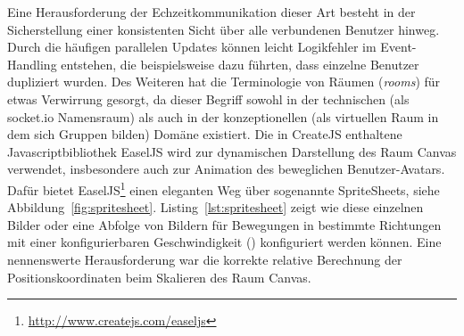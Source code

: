 Eine Herausforderung der Echzeitkommunikation dieser Art besteht in der Sicherstellung einer konsistenten Sicht über alle verbundenen Benutzer hinweg. Durch die häufigen parallelen Updates können leicht Logikfehler im Event-Handling entstehen, die beispielsweise dazu führten, dass einzelne Benutzer dupliziert wurden. Des Weiteren hat die Terminologie von Räumen (\emph{rooms}) für etwas Verwirrung gesorgt, da dieser Begriff sowohl in der technischen (als socket.io Namensraum) als auch in der konzeptionellen (als virtuellen Raum in dem sich Gruppen bilden) Domäne existiert.
\newline\newline
Die in CreateJS enthaltene Javascriptbibliothek EaselJS wird zur dynamischen Darstellung des Raum Canvas verwendet, insbesondere auch zur Animation des beweglichen Benutzer-Avatars. Dafür bietet EaselJS\footnote{\url{http://www.createjs.com/easeljs}} einen eleganten Weg über sogenannte SpriteSheets, siehe Abbildung~\ref{fig:spritesheet}. Listing~\ref{lst:spritesheet} zeigt wie diese einzelnen Bilder oder eine Abfolge von Bildern für Bewegungen in bestimmte Richtungen mit einer konfigurierbaren Geschwindigkeit () konfiguriert werden können. Eine nennenswerte Herausforderung war die korrekte relative Berechnung der Positionskoordinaten beim Skalieren des Raum Canvas.

